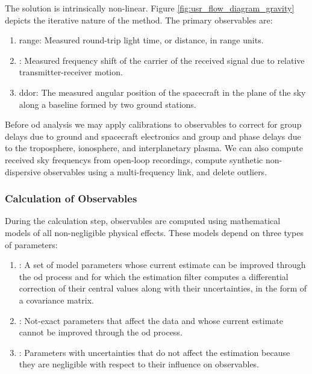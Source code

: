 \documentclass{article}
\theoremstyle{mystyle}
\begin{document}
\noindent The solution is intrinsically non-linear. Figure \ref{fig:usr_flow_diagram_gravity} depicts the iterative nature of the method. The primary observables are:

\begin{enumerate}[itemsep=0pt]
\item \Gls{range}: Measured round-trip light time, or distance, in range units.
\item {}: Measured frequency shift of the carrier of the received signal due to relative transmitter-receiver motion.
\item \gls{ddor}: The measured angular position of the spacecraft in the plane of the sky along a baseline formed by two ground stations.
\end{enumerate}

\noindent Before \gls{od} analysis we may apply calibrations to observables to correct for \glspl{group delay} due to ground and spacecraft electronics and group and \glspl{phase delay} due to the \gls{troposphere}, \gls{ionosphere}, and \gls{interplanetary plasma}. We can also compute received \glspl{sky frequency} from \gls{open-loop} recordings, compute synthetic non-dispersive observables using a multi-frequency link, and delete \glspl{outlier}.

\subsubsection{\footnotesize Calculation of Observables}

During the calculation step, observables are computed using mathematical models of all non-negligible physical effects. These models depend on three types of parameters:

\begin{enumerate}[itemsep=0pt]
\item {}: A set of model parameters whose current estimate can be improved through the \gls{od} process and for which the estimation filter computes a differential correction of their central values along with their uncertainties, in the form of a \gls{covariance matrix}.
\item {}: Not-exact parameters that affect the data and whose current estimate cannot be improved through the \gls{od} process.
\item {}: Parameters with uncertainties that do not affect the estimation because they are negligible with respect to their influence on observables.
\end{enumerate}
\end{document}
